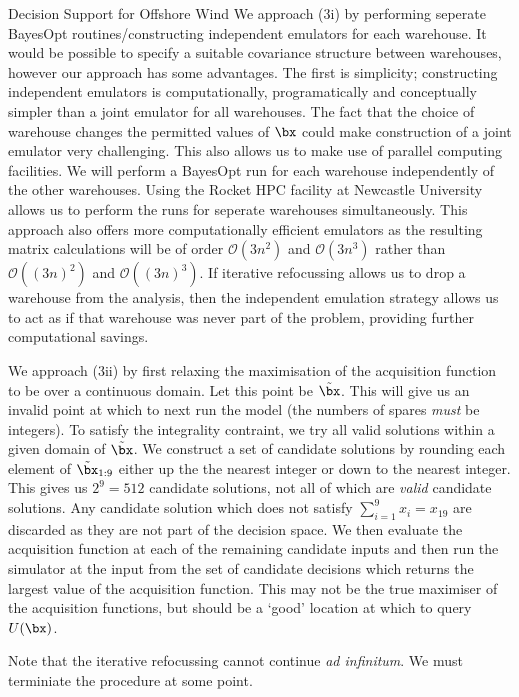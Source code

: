 \begin{chapter}{Decision Support for Offshore Wind \label{Ch:ds-for-ow}}
We approach (3i) by performing seperate BayesOpt routines/constructing independent emulators for each warehouse. It would be possible to specify a suitable covariance structure between warehouses, however our approach has some advantages. The first is simplicity; constructing independent emulators is computationally, programatically and conceptually simpler than a joint emulator for all warehouses. The fact that the choice of warehouse changes the permitted values of $\bx$ could make construction of a joint emulator very challenging.  This also allows us to make use of parallel computing facilities. We will perform a BayesOpt run for each warehouse independently of the other warehouses. Using the Rocket HPC facility at Newcastle University allows us to perform the runs for seperate warehouses simultaneously. This approach also offers more computationally efficient emulators as the resulting matrix calculations will be of order $\mathcal{O}(3n^2)$ and $\mathcal{O}(3n^3)$ rather than $\mathcal{O}((3n)^2)$ and $\mathcal{O}((3n)^3)$. If iterative refocussing allows us to drop a warehouse from the analysis, then the independent emulation strategy allows us to act as if that warehouse was never part of the problem,  providing further computational savings.

We approach (3ii) by first relaxing the maximisation of the acquisition function to be over a continuous domain. Let this point be $\tilde{\bx}$. This will give us an invalid point at which to next run the model (the numbers of spares \textit{must} be integers). To satisfy the integrality contraint, we try all valid solutions within a given domain of $\tilde{\bx}$. We construct a set of candidate solutions by rounding each element of $\tilde{\bx}_{1:9}$ either up the the nearest integer or down to the nearest integer.  This gives us $2^9 = 512$ candidate solutions, not all of which are \textit{valid} candidate solutions. Any candidate solution which does not satisfy $\sum_{i = 1}^9 x_i = x_{19}$ are discarded as they are not part of the decision space. We then evaluate the acquisition function at each of the remaining candidate inputs and then run the simulator at the input from the set of candidate decisions which returns the largest value of the acquisition function. This may not be the true maximiser of the acquisition functions, but should be a `good' location at which to query $U(\bx)$.

Note that the iterative refocussing cannot continue \textit{ad infinitum}. We must terminiate the procedure at some point.



\end{chapter}
